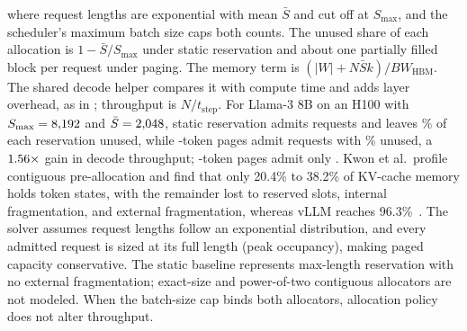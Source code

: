 \documentclass[10pt,twocolumn]{article}
\begin{document}
where request lengths are exponential with mean $\bar{S}$ and cut off at $S_{\max}$, and the scheduler's maximum batch size caps both counts. The unused share of each allocation is $1 - \bar{S}/S_{\max}$ under static reservation and about one partially filled block per request under paging. The memory term is $(|W|+N\bar{S}k)/BW_{\text{HBM}}$. The shared decode helper compares it with compute time and adds layer overhead, as in ; throughput is $N/t_{\text{step}}$. For Llama-3 8B on an H100 with $S_{\max} = 8{,}192$ and $\bar{S} = 2{,}048$, static reservation admits \WallFiveStaticUsers{} requests and leaves \WallFiveStaticWastePct\% of each reservation unused, while \WallFivePageSize-token pages admit \WallFivePagedUsers{} requests with \WallFivePagedWastePct\% unused, a $1.56{\times}$ gain in decode throughput; \WallFiveLargePageSize-token pages admit only \WallFiveLargePagePagedUsers{}. Kwon et al.\ profile contiguous pre-allocation and find that only 20.4\% to 38.2\% of KV-cache memory holds token states, with the remainder lost to reserved slots, internal fragmentation, and external fragmentation, whereas vLLM reaches 96.3\%~\citep{kwon2023}. The solver assumes request lengths follow an exponential distribution, and every admitted request is sized at its full length (peak occupancy), making paged capacity conservative. The static baseline represents max-length reservation with no external fragmentation; exact-size and power-of-two contiguous allocators are not modeled. When the batch-size cap binds both allocators, allocation policy does not alter throughput.
\end{document}
